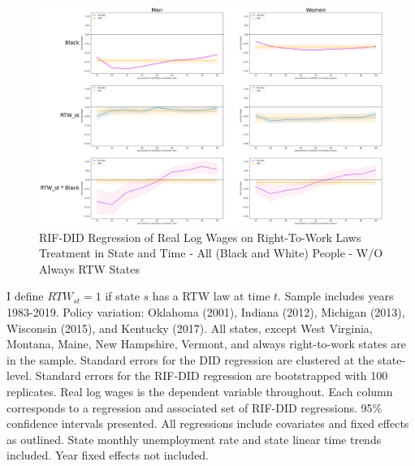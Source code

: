 \documentclass[11pt]{article}
\begin{document}
{\pagebreak
\begin{landscape}
\begin{figure}[ht!]
\centering
    \caption{RIF-DID Regression of Real Log Wages on Right-To-Work Laws Treatment in State and Time - All (Black and White) People - W/O Always RTW States}\label{fig:rifdid-sltt-wo-ar2w-A}
    \includegraphics[width=1.25\textwidth, height = \textheight, keepaspectratio]{figures/fin_rifdid-sltt-wo-ar2w-A.png}
\end{figure}
\footnotesize{I define $RTW_{st} = 1$ if state $s$ has a RTW law at time $t$. Sample includes years 1983-2019. Policy variation: Oklahoma (2001), Indiana (2012), Michigan (2013), Wisconsin (2015), and Kentucky (2017). All states, except West Virginia, Montana, Maine, New Hampshire, Vermont, and always right-to-work states are in the sample. Standard errors for the DID regression are clustered at the state-level. Standard errors for the RIF-DID regression are bootstrapped with 100 replicates. Real log wages is the dependent variable throughout. Each column corresponds to a regression and associated set of RIF-DID regressions. 95\% confidence intervals presented. All regressions include covariates and fixed effects as outlined. State monthly unemployment rate and state linear time trends included. Year fixed effects not included.}
\end{landscape}

}
\end{document}
